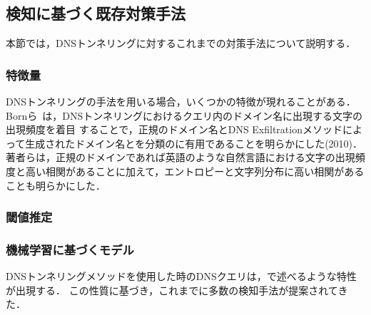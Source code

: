 
\subsection{検知に基づく既存対策手法}
本節では，DNSトンネリングに対するこれまでの対策手法について説明する．
\subsubsection{特徴量}
DNSトンネリングの手法を用いる場合，いくつかの特徴が現れることがある．
Bornら~\cite{born}は，DNSトンネリングにおけるクエリ内のドメイン名に出現する文字の出現頻度を着目
することで，正規のドメイン名とDNS Exfiltrationメソッドによって生成されたドメイン名とを分類のに有用であることを明らかにした(2010)．
著者らは，正規のドメインであれば英語のような自然言語における文字の出現頻度と高い相関があることに加えて，エントロピーと文字列分布に高い相関があることも明らかにした．


\subsubsection{閾値推定}
\subsubsection{機械学習に基づくモデル}
DNSトンネリングメソッドを使用した時のDNSクエリは，で述べるような特性が出現する．
この性質に基づき，これまでに多数の検知手法が提案されてきた．
